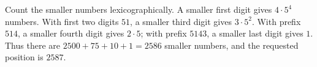 Count the smaller numbers lexicographically. A smaller first digit gives $4\cdot5^4$ numbers. With first two digits $51$, a smaller third digit gives $3\cdot5^2$. With prefix $514$, a smaller fourth digit gives $2\cdot5$; with prefix $5143$, a smaller last digit gives $1$. Thus there are $2500+75+10+1=2586$ smaller numbers, and the requested position is $\boxed{2587}$.

